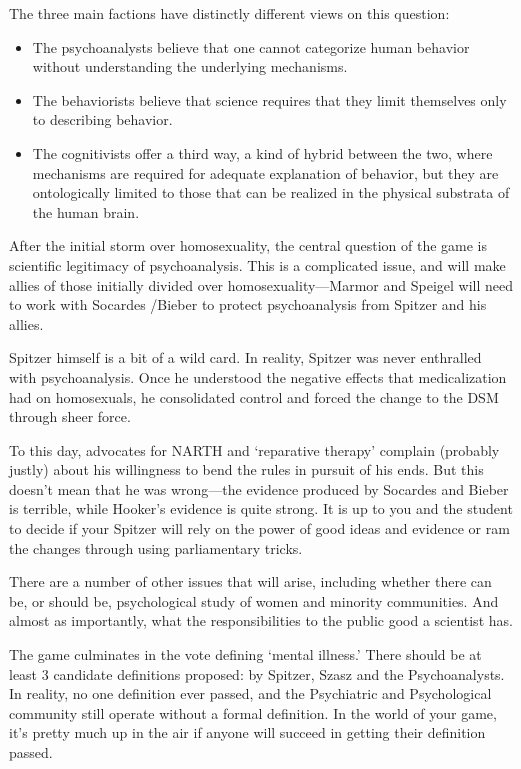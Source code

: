 \begin{refsection}
The three main factions have distinctly different views on this question: 

\begin{itemize}
\item The psychoanalysts believe that one cannot categorize human behavior without understanding the underlying mechanisms. 

\item The behaviorists believe that science requires that they limit themselves only to describing behavior. 

\item The cognitivists offer a third way, a kind of hybrid between the two, where mechanisms are required for adequate explanation of behavior, but they are ontologically limited to those that can be realized in the physical substrata of the human brain.

\end{itemize}

After the initial storm over homosexuality, the central question of the game is scientific legitimacy of psychoanalysis. This is a complicated issue, and will make allies of those initially divided over homosexuality---Marmor and Speigel will need to work with Socardes \slash  Bieber to protect psychoanalysis from Spitzer and his allies.

Spitzer himself is a bit of a wild card. In reality, Spitzer was never enthralled with psychoanalysis. Once he understood the negative effects that medicalization had on homosexuals, he consolidated control and forced the change to the DSM through sheer force. 

To this day, advocates for NARTH and ‘reparative therapy’ complain (probably justly) about his willingness to bend the rules in pursuit of his ends. But this doesn’t mean that he was wrong---the evidence produced by Socardes and Bieber is terrible, while Hooker’s evidence is quite strong. It is up to you and the student to decide if your Spitzer will rely on the power of good ideas and evidence or ram the changes through using parliamentary tricks.

There are a number of other issues that will arise, including whether there can be, or should be, psychological study of women and minority communities. And almost as importantly, what the responsibilities to the public good a scientist has.

The game culminates in the vote defining ‘mental illness.’ There should be at least 3 candidate definitions proposed: by Spitzer, Szasz and the Psychoanalysts. In reality, no one definition ever passed, and the Psychiatric and Psychological community still operate without a formal definition. In the world of your game, it’s pretty much up in the air if anyone will succeed in getting their definition passed.


\end{refsection}
